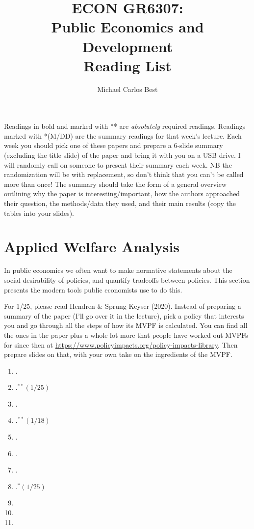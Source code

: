 \documentclass[11pt]{article}
\begin{document}
\title{ECON GR6307: \\ Public Economics and Development \\ Reading List}
\author{Michael Carlos Best}

\maketitle

Readings in bold and marked with ** are \textit{absolutely} required readings. Readings marked with *(M/DD) are the summary readings for that week's lecture. Each week you should pick one of these papers and prepare a 6-slide summary (excluding the title slide) of the paper and bring it with you on a USB drive. I will randomly call on someone to present their summary each week. NB the randomization will be with replacement, so don't think that you can't be called more than once! The summary should take the form of a general overview outlining why the paper is interesting/important, how the authors approached their question, the methods/data they used, and their main results (copy the tables into your slides).

\section{Applied Welfare Analysis}

In public economics we often want to make normative statements about the social desirability of policies, and quantify tradeoffs between policies. This section presents the modern tools public economists use to do this. 

For 1/25, please read Hendren \& Sprung-Keyser (2020). Instead of preparing a summary of the paper (I'll go over it in the lecture), pick a policy that interests you and go through all the steps of how its MVPF is calculated. You can find all the ones in the paper plus a whole lot more that people have worked out MVPFs for since then at \url{https://www.policyimpacts.org/policy-impacts-library}. Then prepare slides on that, with your own take on the ingredients of the MVPF.

\begin{enumerate}
\item {}.
\item {}.$^{**}(1/25)$
\item {}.
\item \textbf{.$^{**}(1/18)$}
\item {}.
\item {}.
\item {}.
\item {}.$^{*}(1/25)$
\item {}
\item {}
\item {}
\end{enumerate}
\end{document}
